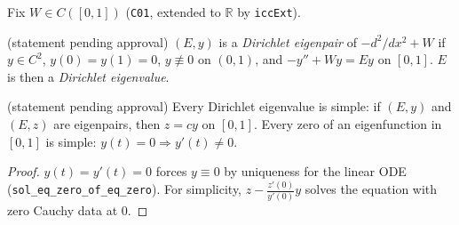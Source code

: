 
Fix $W\in C([0,1])$ (\texttt{C01}, extended to $\mathbb R$ by \texttt{iccExt}).

\begin{definition}
  \label{def:dirichlet_eigen}
  (statement pending approval)
  $(E,y)$ is a \emph{Dirichlet eigenpair} of $-d^2/dx^2+W$ if $y\in C^2$, $y(0)=y(1)=0$, $y\not\equiv0$ on $(0,1)$,
  and $-y''+Wy=Ey$ on $[0,1]$. $E$ is then a \emph{Dirichlet eigenvalue}.
\end{definition}

\begin{theorem}[Simplicity]
  \label{thm:sl_simple}
  (statement pending approval)
  Every Dirichlet eigenvalue is simple: if $(E,y)$ and $(E,z)$ are eigenpairs, then $z=cy$ on $[0,1]$. Every zero of
  an eigenfunction in $[0,1]$ is simple: $y(t)=0\Rightarrow y'(t)\ne0$.
\end{theorem}
\begin{proof}
  $y(t)=y'(t)=0$ forces $y\equiv0$ by uniqueness for the linear ODE (\texttt{sol\_eq\_zero\_of\_eq\_zero}). For simplicity,
  $z-\frac{z'(0)}{y'(0)}y$ solves the equation with zero Cauchy data at $0$.
\end{proof}

